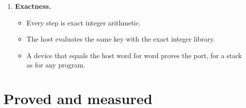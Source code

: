 \begin{enumerate}
\begin{itemize}
\begin{itemize}
\item a table (a sub-function of up to 32 input bits becomes one lookup, and composition keeps its order);
\item narrower registers (fewer limbs a step);
\item folded, dropped and shared steps (below: steps and their reduction).
\end{itemize}
\end{itemize}
\item \textbf{Exactness.}

\begin{itemize}
\item Every step is exact integer arithmetic.
\item The host evaluates the same key with the exact integer library.
\item A device that equals the host word for word proves the port, for a stack as for any program.
\end{itemize}
\end{enumerate}

\section{\texorpdfstring{Proved and measured}{Proved and measured}}

